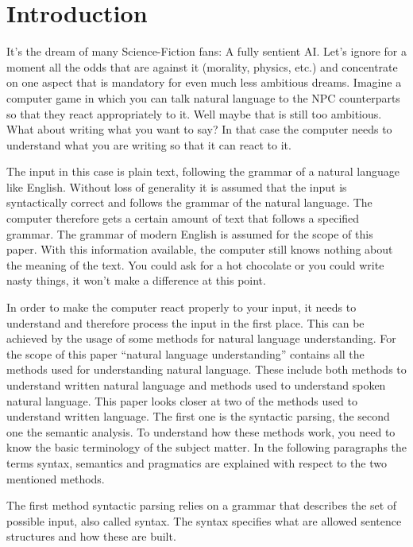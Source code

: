 \documentclass[12pt,twoside]{scrartcl}
\theoremstyle{plain}
\theoremstyle{definition}
\theoremstyle{remark}
\begin{document}

\section{Introduction}
\label{sec:introduction}

	It's the dream of many Science-Fiction fans: A fully sentient AI. Let's ignore for a moment all the odds that are against it (morality, physics, etc.) and concentrate on one aspect that is mandatory for even much less ambitious dreams. Imagine a computer game in which you can talk natural language to the NPC counterparts so that they react appropriately to it. Well maybe that is still too ambitious. What about writing what you want to say? In that case the computer needs to understand what you are writing so that it can react to it.
	
	The input in this case is plain text, following the grammar of a natural language like English. Without loss of generality it is assumed that the input is syntactically correct and follows the grammar of the natural language. The computer therefore gets a certain amount of text that follows a specified grammar. The grammar of modern English is assumed for the scope of this paper. With this information available, the computer still knows nothing about the meaning of the text. You could ask for a hot chocolate or you could write nasty things, it won't make a difference at this point.
	
	In order to make the computer react properly to your input, it needs to understand and therefore process the input in the first place. This can be achieved by the usage of some methods for natural language understanding. For the scope of this paper ``natural language understanding'' contains all the methods used for understanding natural language. These include both methods to understand written natural language and methods used to understand spoken natural language. This paper looks closer at two of the methods used to understand written language. The first one is the syntactic parsing, the second one the semantic analysis. To understand how these methods work, you need to know the basic terminology of the subject matter. In the following paragraphs the terms syntax, semantics and pragmatics are explained with respect to the two mentioned methods.
	
	The first method syntactic parsing relies on a grammar that describes the set of possible input, also called syntax. The syntax specifies what are allowed sentence structures and how these are built.
	
\end{document}
